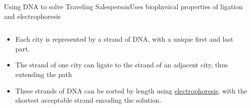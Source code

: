 \begin{frame}{Using DNA to solve Traveling Salesperson}{Uses biophysical properties of ligation and electrophoresis}
    
\begin{columns}
    \begin{column}{0.5\textwidth}
        \begin{itemize}
            \item<1-> Each city is represented by a strand of DNA, with a unique first and last part.
            \item<2-> The strand of one city can ligate to the strand of an adjacent city, thus extending the path
            \item<3-> These strands of DNA can be sorted by length using \href{https://en.wikipedia.org/wiki/Gel_electrophoresis}{electrophoresis}, with the shortest acceptable strand encoding the solution.
        \end{itemize}
 
    \end{column}
\end{columns}

\end{frame}

